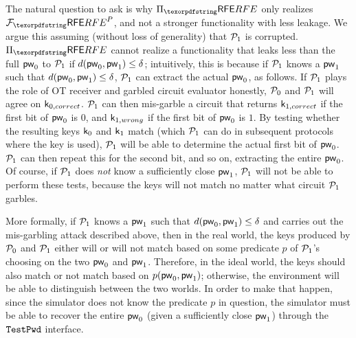 The natural question to ask is why $\Prfe$ only realizes $\Frfe^{P}$, and not a stronger functionality with less leakage.
We argue this assuming (without loss of generality) that $\mathcal{P}_{1}$ is corrupted.
$\Prfe$ cannot realize a functionality that leaks less than the full \password $\mathsf{pw}_{0}$ to $\mathcal{P}_{1}$ if $d(\mathsf{pw}_{0}, \mathsf{pw}_{1}) \leq \delta$;
intuitively, this is because if $\mathcal{P}_{1}$ knows a \password $\mathsf{pw}_{1}$ such that $d(\mathsf{pw}_{0}, \mathsf{pw}_{1}) \leq \delta$,
$\mathcal{P}_{1}$ can extract the actual \password $\mathsf{pw}_{0}$, as follows.
If $\mathcal{P}_{1}$ plays the role of OT receiver and garbled circuit evaluator honestly, 
$\mathcal{P}_{0}$ and $\mathcal{P}_{1}$ will agree on $\mathsf{k}_{0, correct}$.
$\mathcal{P}_{1}$ can then mis-garble a circuit that returns $\mathsf{k}_{1, correct}$ if the first bit of $\mathsf{pw}_{0}$ is $0$, and $\mathsf{k}_{1, wrong}$ if the first bit of $\mathsf{pw}_{0}$ is $1$. 
By testing whether the resulting keys $\mathsf{k}_{0}$ and $\mathsf{k}_{1}$ match (which $\mathcal{P}_{1}$ can do in subsequent protocols where the key is used), $\mathcal{P}_{1}$ will be able to determine the actual first bit of $\mathsf{pw}_{0}$.
$\mathcal{P}_{1}$ can then repeat this for the second bit, and so on, extracting the entire \password $\mathsf{pw}_{0}$.
Of course, if $\mathcal{P}_{1}$ does \emph{not} know a sufficiently close $\mathsf{pw}_{1}$, $\mathcal{P}_{1}$ will not be able to perform these tests, because the keys will not match no matter what circuit $\mathcal{P}_{1}$ garbles.

More formally, if $\mathcal{P}_{1}$ knows a \password $\mathsf{pw}_{1}$ such that $d(\mathsf{pw}_{0}, \mathsf{pw}_{1}) \leq \delta$ and carries out the mis-garbling attack described above, then in the real world, the keys produced by $\mathcal{P}_{0}$ and $\mathcal{P}_{1}$ either will or will not match based on some predicate $p$ of $\mathcal{P}_{1}$'s choosing on the two \passwords $\mathsf{pw}_{0}$ and $\mathsf{pw}_{1}$.
Therefore, in the ideal world, the keys should also match or not match based on $p(\mathsf{pw}_{0}, \mathsf{pw}_{1})$; otherwise, the environment will be able to distinguish between the two worlds. 
In order to make that happen, since the simulator does not know the predicate $p$ in question, the simulator must be able to recover the entire \password $\mathsf{pw}_{0}$ (given a sufficiently close $\mathsf{pw}_{1}$) through the $\texttt{TestPwd}$ interface.

